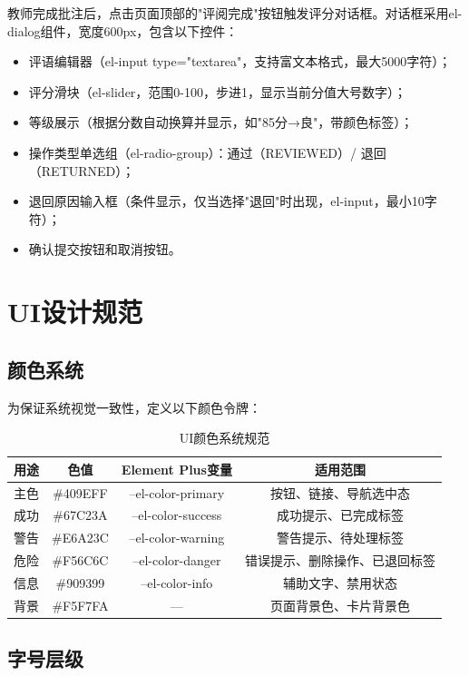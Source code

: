 \documentclass{../../softeng}
\begin{document}
教师完成批注后，点击页面顶部的"评阅完成"按钮触发评分对话框。对话框采用el-dialog组件，宽度600px，包含以下控件：
\begin{itemize}
    \item 评语编辑器（el-input type="textarea"，支持富文本格式，最大5000字符）；
    \item 评分滑块（el-slider，范围0-100，步进1，显示当前分值大号数字）；
    \item 等级展示（根据分数自动换算并显示，如"85分→良"，带颜色标签）；
    \item 操作类型单选组（el-radio-group）：通过（REVIEWED）/ 退回（RETURNED）；
    \item 退回原因输入框（条件显示，仅当选择"退回"时出现，el-input，最小10字符）；
    \item 确认提交按钮和取消按钮。
\end{itemize}

\section{UI设计规范}

\subsection{颜色系统}

为保证系统视觉一致性，定义以下颜色令牌：

\begin{table}[htbp]
\centering
\caption{UI颜色系统规范}
\label{tab:ui_color}
\begin{tabular}{|c|c|c|c|}
\hline
\textbf{用途} & \textbf{色值} & \textbf{Element Plus变量} & \textbf{适用范围} \\
\hline
主色 & \#409EFF & --el-color-primary & 按钮、链接、导航选中态 \\
\hline
成功 & \#67C23A & --el-color-success & 成功提示、已完成标签 \\
\hline
警告 & \#E6A23C & --el-color-warning & 警告提示、待处理标签 \\
\hline
危险 & \#F56C6C & --el-color-danger & 错误提示、删除操作、已退回标签 \\
\hline
信息 & \#909399 & --el-color-info & 辅助文字、禁用状态 \\
\hline
背景 & \#F5F7FA & — & 页面背景色、卡片背景色 \\
\hline
\end{tabular}
\end{table}

\subsection{字号层级}
\end{document}
